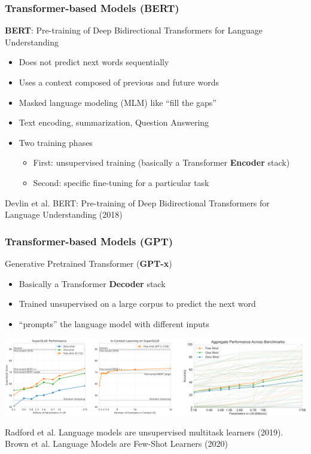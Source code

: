 \documentclass[10pt]{beamer}
\begin{document}
\begin{frame}
  \frametitle{Transformer-based Models (BERT)}
{\color{red}\textbf{BERT}: Pre-training of Deep Bidirectional Transformers for Language Understanding}

\begin{itemize}
\setlength\itemsep{.8em}
\item Does not predict next words sequentially
\item Uses a context composed of previous and future words
\item Masked language modeling (MLM) like ``fill the gaps''
\item Text encoding, summarization, Question Answering
\item Two training phases
\begin{itemize}
\item First: unsupervised training (basically a Transformer \textbf{Encoder} stack)
\item Second: specific fine-tuning for a particular task
\end{itemize} 
\end{itemize} 
\vspace{.5cm}
\scriptsize{Devlin et al. BERT: Pre-training of Deep Bidirectional Transformers for Language Understanding (2018)}
\end{frame}

\begin{frame}
  \frametitle{Transformer-based Models (GPT)}
{\color{red}Generative Pretrained Transformer (\textbf{GPT-x})}

\begin{itemize}
\setlength\itemsep{.3em}
\item Basically a Transformer \textbf{Decoder} stack
\item Trained unsupervised on a large corpus to predict the next word
\item ``prompts'' the language model with different inputs
\end{itemize}
	\includegraphics[width=\columnwidth]{images/gptc}
\vspace{.05cm}

\scriptsize{Radford et al. Language models are unsupervised multitask learners (2019).\\
Brown et al. Language Models are Few-Shot Learners (2020)}
\end{frame}
\end{document}

